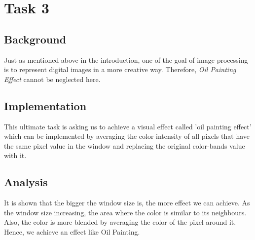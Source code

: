 \documentclass{article}
\begin{document}
\newpage

\section{Task 3}
\subsection{Background}
Just as mentioned above in the introduction, one of the goal of image processing is to represent digital images in a more creative way. Therefore, \textit{Oil Painting Effect} cannot be neglected here.

\subsection{Implementation}
This ultimate task is asking us to achieve a visual effect called 'oil painting
effect' which can be implemented by averaging the color intensity of all pixels
that have the same pixel value in the window and replacing the original
color-bands value with it.

\subsection{Analysis}
It is shown that the bigger the window size is, the more effect we can achieve. As the window size increasing, the area where the color is similar to its neighbours. Also, the color is more blended by averaging the color of the pixel around it. Hence, we achieve an effect like Oil Painting.
\end{document}
